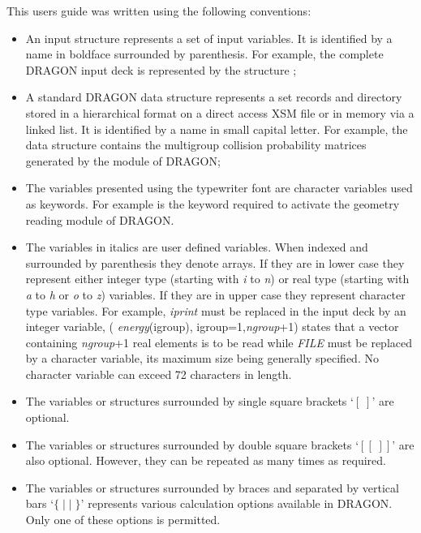 This users guide was written using the following conventions:

\begin{itemize}

\item An input structure represents a set of input variables. It is identified
by a name in boldface surrounded by parenthesis. For example, the complete
DRAGON input deck is represented by the structure ;

\item A standard DRAGON data structure represents a set records and directory
stored in a hierarchical format on a direct access
XSM file or in memory via a linked list.\cite{DragonDataStructures} It is
identified by a name in small capital letter.
For example, the data structure  contains the multigroup collision
probability matrices generated by the  module of DRAGON;

\item The variables presented using the typewriter font are character
variables used as keywords. For example  is the keyword required to
activate the geometry reading module of DRAGON.

\item The variables in italics are user defined variables. When indexed and
surrounded by parenthesis they denote arrays. If they are in lower case they
represent either integer type  (starting with {\it i} to {\it n}) or real type
(starting with  {\it a} to {\it h} or {\it o} to {\it z}) variables. If they are
in upper case they represent character type variables. For example, {\it iprint}
must be replaced in the input deck by an integer variable,  ({\it
energy}(igroup), igroup=1,{\it ngroup}+1) states that a vector containing {\it
ngroup}+1 real elements is to be read while {\it FILE} must be replaced by a
character variable, its maximum size being generally specified. 
No character variable can exceed 72 characters in length.

\item The variables or structures surrounded by single square brackets `$[\;]$'
are optional.

\item The variables or structures surrounded by double square brackets
`$[[\;]]$' are also optional. However, they can be repeated as many times
as required.

\item The variables or structures surrounded by braces and separated by vertical
bars `$\{\; |\; |\; \}$' represents various calculation options available
in DRAGON. Only one of these options is permitted.

\end{itemize}

